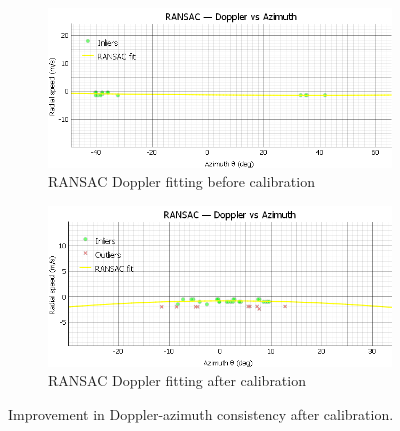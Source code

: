 \begin{figure}[ht]
    \centering
    \begin{subfigure}[b]{0.3\textwidth}
        \includegraphics[width=\textwidth]{images/dualSensorCalibRANSAC_2mts.png}
        \caption{RANSAC Doppler fitting before calibration}
    \end{subfigure}
    \hfill
    \begin{subfigure}[b]{0.3\textwidth}
        \includegraphics[width=\textwidth]{images/AFTERdualSensorCalibRANSAC_2mts.png}
        \caption{RANSAC Doppler fitting after calibration}
    \end{subfigure}
    \caption{Improvement in Doppler-azimuth consistency after calibration.}
    \label{fig:dualSensorCalib_RANSACComparison}
\end{figure}

\FloatBarrier